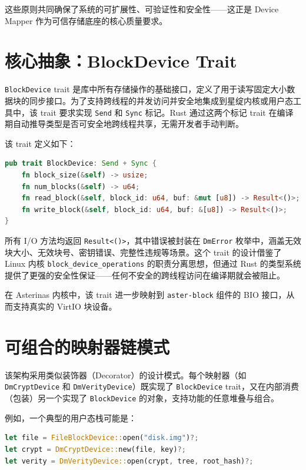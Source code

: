 这些原则共同确保了系统的可扩展性、可验证性和安全性——这正是 Device Mapper 作为可信存储底座的核心质量要求。

\section{核心抽象：BlockDevice Trait}

\texttt{BlockDevice} trait 是库中所有存储操作的基础接口，定义了用于读写固定大小数据块的同步接口。为了支持跨线程的并发访问并安全地集成到星绽内核或用户态工具中，该 trait 要求实现 \texttt{Send} 和 \texttt{Sync} 标记。Rust 通过这两个标记 trait 在编译期自动推导类型是否可安全地跨线程共享，无需开发者手动判断。

该 trait 定义如下：

\begin{lstlisting}[language=Rust, basicstyle=\ttfamily\small, breaklines=true]
pub trait BlockDevice: Send + Sync {
    fn block_size(&self) -> usize;
    fn num_blocks(&self) -> u64;
    fn read_block(&self, block_id: u64, buf: &mut [u8]) -> Result<()>;
    fn write_block(&self, block_id: u64, buf: &[u8]) -> Result<()>;
}
\end{lstlisting}

所有 I/O 方法均返回 \texttt{Result<()>}，其中错误被封装在 \texttt{DmError} 枚举中，涵盖无效块大小、无效块号、密钥错误、完整性违规等场景。这个 trait 的设计借鉴了 Linux 内核 \texttt{block\_device\_operations} 的职责分离思想，但通过 Rust 的类型系统提供了更强的安全性保证——任何不安全的跨线程访问在编译期就会被阻止。

在 Asterinas 内核中，该 trait 进一步映射到 \texttt{aster-block} 组件的 BIO 接口，从而支持真实的 VirtIO 块设备。

\section{可组合的映射器链模式}

该架构采用类似装饰器（Decorator）的设计模式。每个映射器（如 \texttt{DmCryptDevice} 和 \texttt{DmVerityDevice}）既实现了 \texttt{BlockDevice} trait，又在内部消费（包装）另一个实现了 \texttt{BlockDevice} 的对象，支持功能的任意堆叠与组合。

例如，一个典型的用户态栈可能是：

\begin{lstlisting}[language=Rust, basicstyle=\ttfamily\small, breaklines=true]
let file = FileBlockDevice::open("disk.img")?;
let crypt = DmCryptDevice::new(file, key)?;
let verity = DmVerityDevice::open(crypt, tree, root_hash)?;
\end{lstlisting}


